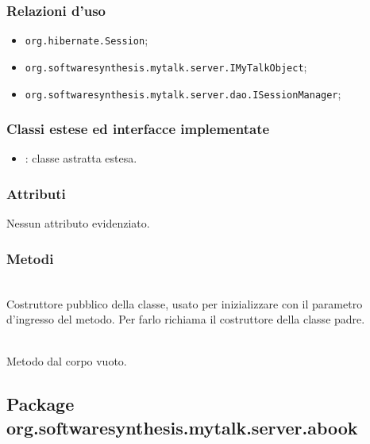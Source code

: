 \subsubsection*{Relazioni d'uso}

\begin{itemize}
		\item \texttt{org.hibernate.Session};
		\item \texttt{org.softwaresynthesis.mytalk.server.IMyTalkObject};
		\item \texttt{org.softwaresynthesis.mytalk.server.dao.ISessionManager};
\end{itemize}

\subsubsection*{Classi estese ed interfacce implementate}

\begin{itemize}
	\item {}: classe astratta estesa.
\end{itemize}

\subsubsection*{Attributi}

Nessun attributo evidenziato.

\subsubsection*{Metodi}

\begin{description}
	\item{}\\
	Costruttore pubblico della classe, usato per inizializzare  con il parametro d'ingresso del metodo. Per farlo richiama il costruttore della classe padre.

	\item{}\\
	Metodo dal corpo vuoto.

\end{description}

\subsection{Package org.softwaresynthesis.mytalk.server.abook}\label{sec:abook}

